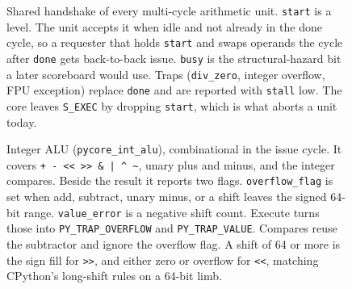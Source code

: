 \begin{figure}[htbp]
\centering
{}
\caption{Shared handshake of every multi-cycle arithmetic unit.
\texttt{start} is a level.
The unit accepts it when idle and not already in the done cycle, so a requester that holds \texttt{start} and swaps operands the cycle after \texttt{done} gets back-to-back issue.
\texttt{busy} is the structural-hazard bit a later scoreboard would use.
Traps (\texttt{div\_zero}, integer overflow, FPU exception) replace \texttt{done} and are reported with \texttt{stall} low.
The core leaves \texttt{S\_EXEC} by dropping \texttt{start}, which is what aborts a unit today.}
\label{fig:hs}
\end{figure}

\begin{figure}[htbp]
\centering
{}
\caption{Integer ALU (\texttt{pycore\_int\_alu}), combinational in the issue cycle.
It covers \texttt{+ - << >> \& | \textasciicircum\ \textasciitilde}, unary plus and minus, and the integer compares.
Beside the result it reports two flags.
\texttt{overflow\_flag} is set when add, subtract, unary minus, or a shift leaves the signed 64-bit range.
\texttt{value\_error} is a negative shift count.
Execute turns those into \texttt{PY\_TRAP\_OVERFLOW} and \texttt{PY\_TRAP\_VALUE}.
Compares reuse the subtractor and ignore the overflow flag.
A shift of 64 or more is the sign fill for \texttt{>>}, and either zero or overflow for \texttt{<<}, matching CPython's long-shift rules on a 64-bit limb.}
\label{fig:alu}
\end{figure}

